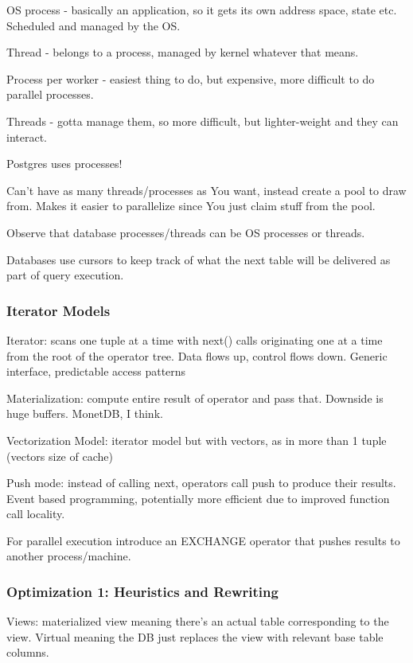 \documentclass{article}
\begin{document}
			OS process - basically an application, so it gets its own address space, state etc. Scheduled and managed by the OS.
			
			Thread - belongs to a process, managed by kernel whatever that means.
			
			Process per worker - easiest thing to do, but expensive, more difficult to do parallel processes.
			
			Threads - gotta manage them, so more difficult, but lighter-weight and they can interact.
			
			Postgres uses processes!
			
			Can't have as many threads/processes as You want, instead create a pool to draw from. Makes it easier to parallelize since You just claim stuff from the pool.
			
			Observe that database processes/threads can be OS processes or threads.
			
			Databases use cursors to keep track of what the next table will be delivered as part of query execution.
			
		\subsubsection{Iterator Models}
		
			Iterator: scans one tuple at a time with next() calls originating one at a time from the root of the operator tree. Data flows up, control flows down. Generic interface, predictable access patterns
			
			Materialization: compute entire result of operator and pass that. Downside is huge buffers. MonetDB, I think.
			
			Vectorization Model: iterator model but with vectors, as in more than 1 tuple (vectors size of cache)
			
			Push mode: instead of calling next, operators call push to produce their results. Event based programming, potentially more efficient due to improved function call locality.
			
			For parallel execution introduce an EXCHANGE operator that pushes results to another process/machine.
			
		\subsubsection{Optimization 1: Heuristics and Rewriting}
		
			Views: materialized view meaning there's an actual table corresponding to the view. Virtual meaning the DB just replaces the view with relevant base table columns. 
			
\end{document}
